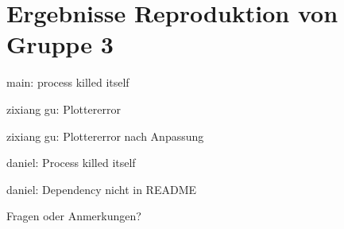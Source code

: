 \documentclass[aspectratio=169,10pt]{beamer}
\begin{document}
\section{Ergebnisse Reproduktion von Gruppe 3}
\begin{frame}{main: process killed itself}
\begin{center}
\end{center}
\end{frame}
\begin{frame}{zixiang gu: Plottererror}
\begin{center}
\end{center}
\end{frame}
\begin{frame}{zixiang gu: Plottererror nach Anpassung}
\begin{center}
\end{center}
\end{frame}
\begin{frame}{daniel: Process killed itself}
\begin{center}
\end{center}
\end{frame}
\begin{frame}{daniel: Dependency nicht in README}
\begin{center}
\end{center}
\end{frame}

\begin{frame}[t,standout]
\Large
Fragen oder Anmerkungen?
\end{frame}
\end{document}
